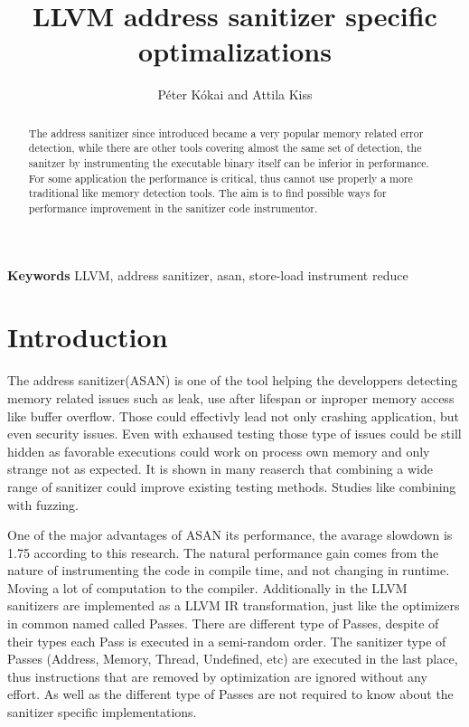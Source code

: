 \documentclass[letterpaper, 10 pt, conference]{IEEEtran}  %
\title{\LARGE \bf
LLVM address sanitizer specific optimalizations
}
\author{P\'eter K\'okai and Attila Kiss}
\let\cite\parencite
\begin{document}
\maketitle
\thispagestyle{empty}
\pagestyle{empty}


\begin{abstract}
The address sanitizer since introduced became a very popular memory related error detection, while there are other tools covering almost the same set of detection, the sanitzer by instrumenting the executable binary itself can be inferior in performance. For some application the performance is critical, thus cannot use properly a more traditional like memory detection tools.
The aim is to find possible ways for performance improvement in the sanitizer code instrumentor.


\end{abstract} \hspace{10pt}

\small \textbf{Keywords} LLVM, address sanitizer, asan, store-load instrument reduce

\section{Introduction}

The address sanitizer(ASAN) is one of the tool helping the developpers detecting memory related issues such as leak, use after lifespan or inproper memory access like buffer overflow. Those could effectivly lead not only crashing application, but even security issues. Even with exhaused testing those type of issues could be still hidden as favorable executions could work on process own memory and only strange not as expected. It is shown in many reaserch that combining a wide range of sanitizer could improve existing testing methods. Studies like combining with fuzzing\cite{alkazimi2016heartbleed}\cite{bohme2017directed}.

One of the major advantages of ASAN its performance, the avarage slowdown is 1.75 according to this research\cite{serebryany2012addresssanitizer}. The natural performance gain comes from the nature of instrumenting the code in compile time, and not changing in runtime. Moving a lot of computation to the compiler. Additionally in the LLVM sanitizers are implemented as a LLVM IR\cite{llvm-ir} transformation, just like the optimizers in common named called Passes. There are different type of Passes, despite of their types each Pass is executed in a semi-random order. The sanitizer type of Passes (Address, Memory, Thread, Undefined, etc) are executed in the last place, thus instructions that are removed by optimization are ignored without any effort. As well as the different type of Passes are not required to know about the sanitizer specific implementations.
\end{document}

